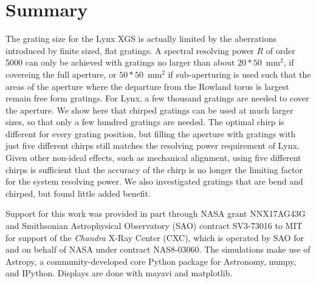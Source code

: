\documentclass[]{spie}  %
\begin{document}
\section{Summary}
\label{sect:summary}
The grating size for the Lynx XGS is actually limited by the aberrations introduced by finite sized, flat gratings. A spectral resolving power $R$ of order 5000 can only be achieved with gratings no larger than about $20 * 50$~mm$^2$, if covereing the full aperture, or $50 * 50$~mm$^2$ if sub-aperturing is used such that the areas of the aperture where the departure from the Rowland torus is largest remain free form gratings. For Lynx, a few thousand gratings are needed to cover the aperture. We show here that chirped gratings can be used at much larger sizes, so that only a few hundred gratings are needed. The optimal chirp is different for every grating position, but filling the aperture with gratings with just five different chirps still matches the resolving power requirement of Lynx. Given other non-ideal effects, such as mechanical alignment, using five different chirps is sufficient that the accuracy of the chirp is no longer the limiting factor for the system resolving power.
We also investigated gratings that are bend and chirped, but found little added benefit.

\acknowledgments %
Support
for this work was provided in part through NASA grant NNX17AG43G and
Smithsonian Astrophysical Observatory (SAO) contract SV3-73016 to MIT
for support of the {\em Chandra} X-Ray Center (CXC), which is operated
by SAO for and on behalf of NASA under contract NAS8-03060.  The
simulations make use of Astropy, a community-developed core Python
package for Astronomy\cite{astropy1,astropy2}, numpy\cite{numpy}, and
IPython\cite{IPython}. Displays are done with mayavi\cite{mayavi} and
matplotlib\cite{matplotlib}.


\end{document}
